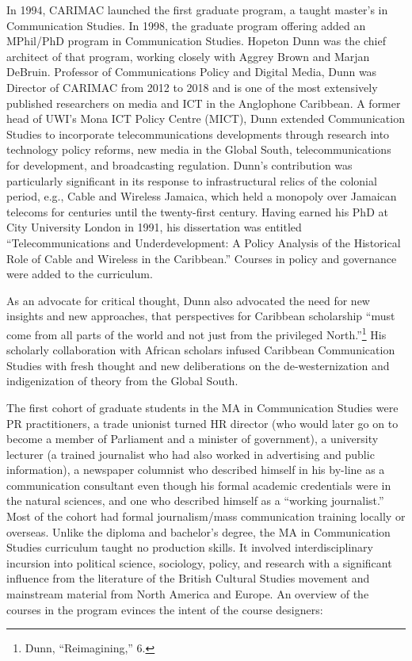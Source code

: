 \documentclass{tufte-handout}
\begin{document}
In 1994, CARIMAC launched the first graduate program, a taught master's
in Communication Studies. In 1998, the graduate program offering added
an MPhil/PhD program in Communication Studies. Hopeton Dunn was the
chief architect of that program, working closely with Aggrey Brown and
Marjan DeBruin. Professor of Communications Policy and Digital Media,
Dunn was Director of CARIMAC from 2012 to 2018 and is one of the most
extensively published researchers on media and ICT in the Anglophone
Caribbean. A former head of UWI's Mona ICT Policy Centre (MICT), Dunn
extended Communication Studies to incorporate telecommunications
developments through research into technology policy reforms, new media
in the Global South, telecommunications for development, and
broadcasting regulation. Dunn's contribution was particularly
significant in its response to infrastructural relics of the colonial
period, e.g., Cable and Wireless Jamaica, which held a monopoly over
Jamaican telecoms for centuries until the twenty-first century. Having
earned his PhD at City University London in 1991, his dissertation was
entitled ``Telecommunications and Underdevelopment: A Policy Analysis of
the Historical Role of Cable and Wireless in the Caribbean.'' Courses in
policy and governance were added to the curriculum.

As an advocate for critical thought, Dunn also advocated the need for
new insights and new approaches, that perspectives for Caribbean
scholarship ``must come from all parts of the world and not just from
the privileged North.''\footnote{Dunn, ``Reimagining,'' 6.} His
scholarly collaboration with African scholars infused Caribbean
Communication Studies with fresh thought and new deliberations on the
de-westernization and indigenization of theory from the Global South.

The first cohort of graduate students in the MA in Communication Studies
were PR practitioners, a trade unionist turned HR director (who would
later go on to become a member of Parliament and a minister of
government), a university lecturer (a trained journalist who had also
worked in advertising and public information), a newspaper columnist who
described himself in his by-line as a communication consultant even
though his formal academic credentials were in the natural sciences, and
one who described himself as a ``working journalist.'' Most of the
cohort had formal journalism/mass communication training locally or
overseas. Unlike the diploma and bachelor's degree, the MA in
Communication Studies curriculum taught no production skills. It
involved interdisciplinary incursion into political science, sociology,
policy, and research with a significant influence from the literature of
the British Cultural Studies movement and mainstream material from North
America and Europe. An overview of the courses in the program evinces
the intent of the course designers:
\end{document}
